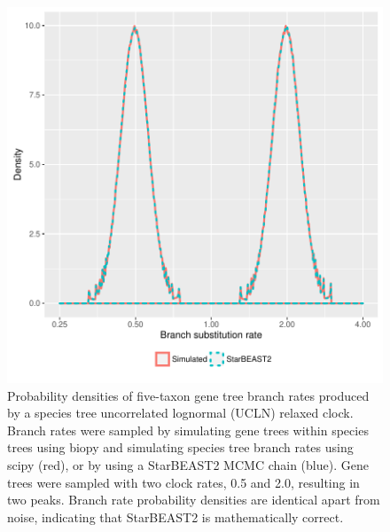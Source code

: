 \documentclass[12pt]{article}
\begin{document}
\begin{figure}[htb!]
\centering
\includegraphics[width=130mm]{gene_branch_rates.pdf}
\caption
{Probability densities of five-taxon gene tree branch rates produced by a
species tree uncorrelated lognormal (UCLN) relaxed clock. Branch rates were
sampled by simulating gene trees within species trees using biopy and simulating
species tree branch rates using scipy (red), or by using a StarBEAST2 MCMC chain
(blue). Gene trees were sampled with two clock rates, 0.5 and 2.0, resulting in
two peaks. Branch rate probability densities are identical apart from noise,
indicating that StarBEAST2 is mathematically correct.}
\label{fig:geneBranchRatesUCLD}
\end{figure}

\clearpage
\end{document}
